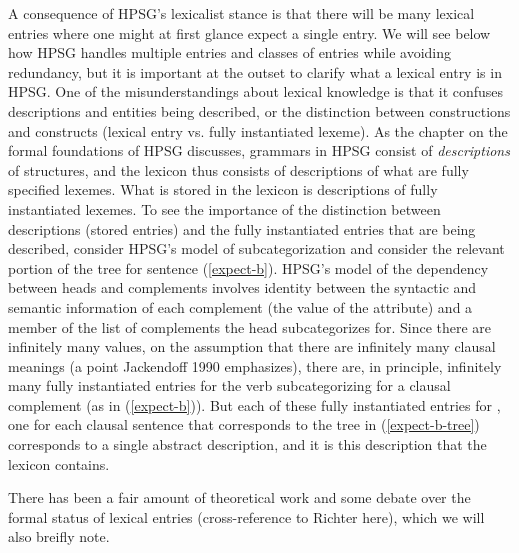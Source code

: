 \documentclass[output=paper]{langsci/langscibook}
\begin{document}
A consequence of HPSG's lexicalist stance is that there will be many lexical entries where one might at first glance expect a single entry. We will see below how HPSG handles multiple entries and classes of entries while avoiding redundancy, but it is important at the outset to clarify what a lexical entry is in HPSG. One of the misunderstandings about lexical knowledge is that it confuses descriptions and entities being described, or the distinction between constructions and constructs (lexical entry vs. fully instantiated lexeme). As the chapter on the formal foundations of HPSG discusses, grammars in HPSG consist of \emph{descriptions} of structures, and the lexicon thus consists of descriptions of what are fully specified lexemes. What is stored in the lexicon is descriptions of fully instantiated lexemes. To see the importance of the distinction between descriptions (stored entries) and the fully instantiated entries that are being described, consider HPSG's model of subcategorization and consider the relevant portion of the tree for sentence (\ref{expect-b}). HPSG's model of the dependency between heads and complements involves identity between the syntactic and semantic information of each complement (the value of the  attribute) and a member of the list of complements the head subcategorizes for. Since there are infinitely many  values, on the assumption that there are infinitely many clausal meanings (a point Jackendoff 1990 emphasizes), there are, in principle, infinitely many fully instantiated entries for the verb  subcategorizing for a clausal complement (as in (\ref{expect-b})). But each of these fully instantiated entries for , one for each clausal sentence that corresponds to the tree in (\ref{expect-b-tree}) corresponds to a single abstract description, and it is this description that the lexicon contains. 

\begin{exe}
	\ex\label{expect-b-tree}
	\Tree
	[ {\begin{avm}\[comps & \< \@1 \>\]\end{avm}} 
	{\begin{avm}\[synsem & \@1 \]\end{avm}} ]
\end{exe}  

\textsf{
There has been a fair amount of theoretical work and some debate over the formal status of lexical entries (cross-reference to Richter here), which we will also breifly note.
}
\end{document}
